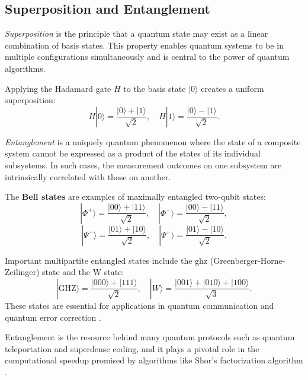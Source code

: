 
\subsection{Superposition and Entanglement}
\label{subsec:superposition}

\begin{definition}[Superposition]
\emph{Superposition} is the principle that a quantum state may exist as a linear combination of basis states. This property enables quantum systems to be in multiple configurations simultaneously and is central to the power of quantum algorithms.
\end{definition}

\begin{example}
Applying the Hadamard gate \(H\) to the basis state \(|0\rangle\) creates a uniform superposition:
\[
H|0\rangle = \frac{|0\rangle + |1\rangle}{\sqrt{2}}, \quad H|1\rangle = \frac{|0\rangle - |1\rangle}{\sqrt{2}}.
\]
\end{example}

\begin{definition}[Entanglement]
\emph{Entanglement} is a uniquely quantum phenomenon where the state of a composite system cannot be expressed as a product of the states of its individual subsystems. In such cases, the measurement outcomes on one subsystem are intrinsically correlated with those on another.
\end{definition}

\begin{example}
The \textbf{Bell states} are examples of maximally entangled two-qubit states:
\[
|\Phi^+\rangle = \frac{|00\rangle + |11\rangle}{\sqrt{2}}, \quad
|\Phi^-\rangle = \frac{|00\rangle - |11\rangle}{\sqrt{2}},
\]
\[
|\Psi^+\rangle = \frac{|01\rangle + |10\rangle}{\sqrt{2}}, \quad
|\Psi^-\rangle = \frac{|01\rangle - |10\rangle}{\sqrt{2}}.
\]
\end{example}

\begin{example}
    Important multipartite entangled states include the \gls{ghz} (Greenberger-Horne-Zeilinger) state and the W state:
    \[
    |\text{GHZ}\rangle = \frac{|000\rangle + |111\rangle}{\sqrt{2}}, \quad
    |W\rangle = \frac{|001\rangle + |010\rangle + |100\rangle}{\sqrt{3}}.
    \]
    These states are essential for applications in quantum communication and quantum error correction \cite{greenberger1990bell}.
\end{example}

\begin{observation}
    Entanglement is the resource behind many quantum protocols such as quantum teleportation \cite{bennett1993teleporting} and superdense coding, and it plays a pivotal role in the computational speedup promised by algorithms like Shor's factorization algorithm \cite{shor1994algorithms}.
\end{observation}
